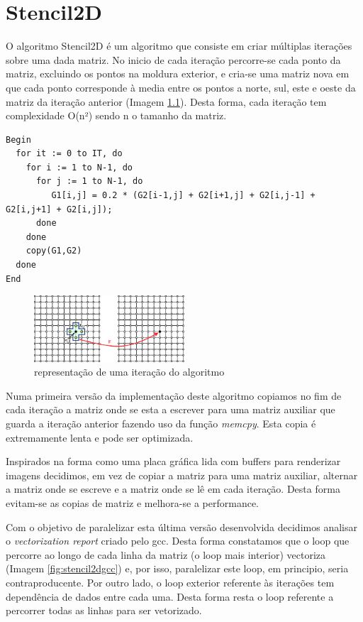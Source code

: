 \documentclass[a4paper]{report}
\begin{document}
\chapter{Stencil2D}

O algoritmo Stencil2D é um algoritmo que consiste em criar múltiplas iterações
sobre uma dada matriz. No inicio de cada iteração percorre-se cada ponto da
matriz, excluindo os pontos na moldura exterior, e cria-se uma matriz nova em
que cada ponto corresponde à media entre os pontos a norte, sul, este e oeste da
matriz da iteração anterior (Imagem \ref{fig:stencil2dit}). Desta forma, cada
iteração tem complexidade O(n²) sendo n o tamanho da matriz.


\begin{verbatim}
Begin
  for it := 0 to IT, do
    for i := 1 to N-1, do
      for j := 1 to N-1, do
         G1[i,j] = 0.2 * (G2[i-1,j] + G2[i+1,j] + G2[i,j-1] + G2[i,j+1] + G2[i,j]);
      done
    done
    copy(G1,G2)
  done
End
\end{verbatim}

\begin{figure}[h]
    \centering
        \includegraphics[width=0.5\textwidth]{images/2D-example-of-stencil-computation.png}
        \caption{representação de uma iteração do algoritmo}
        \label{fig:stencil2dit}
\end{figure}

Numa primeira versão da implementação deste algoritmo copiamos no fim de cada
iteração a matriz onde se esta a escrever para uma matriz auxiliar que guarda a
iteração anterior fazendo uso da função \textit{memcpy}. Esta copia é
extremamente lenta e pode ser optimizada.

Inspirados na forma como uma placa gráfica lida com buffers para renderizar
imagens decidimos, em vez de copiar a matriz para uma matriz auxiliar, alternar
a matriz onde se escreve e a matriz onde se lê em cada iteração. Desta forma
evitam-se as copias de matriz e melhora-se a performance.

Com o objetivo de paralelizar esta última versão desenvolvida decidimos analisar
o \textit{vectorization report} criado pelo gcc. Desta forma constatamos que o
loop que percorre ao longo de cada linha da matriz (o loop mais interior)
vectoriza (Imagem \ref{fig:stencil2dgcc}) e, por isso, paralelizar este loop, em
principio, seria
contraproducente. Por outro lado, o loop exterior referente às iterações tem
dependência de dados entre cada uma. Desta forma resta o loop referente a
percorrer todas as linhas para ser vetorizado.
\end{document}
